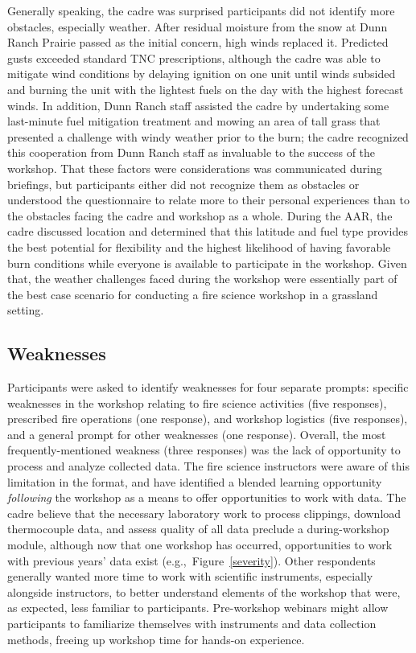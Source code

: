 \documentclass[fire,casereport,accept,moreauthors,pdftex]{Definitions/mdpi}  %
\begin{document}
Generally speaking, the cadre was surprised participants did not identify more obstacles, especially weather.
After residual moisture from the snow at Dunn Ranch Prairie passed as the initial concern, high winds replaced it.
Predicted gusts exceeded standard TNC prescriptions, although the cadre was able to mitigate wind conditions by delaying ignition on one unit until winds subsided and burning the unit with the lightest fuels on the day with the highest forecast winds.
In addition, Dunn Ranch staff assisted the cadre by undertaking some last-minute fuel mitigation treatment and mowing an area of tall grass that presented a challenge with windy weather prior to the burn; the cadre recognized this cooperation from Dunn Ranch staff as invaluable to the success of the workshop.
That these factors were considerations was communicated during briefings, but participants either did not recognize them as obstacles or understood the questionnaire to relate more to their personal experiences than to the obstacles facing the cadre and workshop as a whole.
During the AAR, the cadre discussed location and determined that this latitude and fuel type provides the best potential for flexibility and the highest likelihood of having favorable burn conditions while everyone is available to participate in the workshop. 
Given that, the weather challenges faced during the workshop were essentially part of the best case scenario for conducting a fire science workshop in a grassland setting.

\subsection{Weaknesses}

Participants were asked to identify weaknesses for four separate prompts: specific weaknesses in the workshop relating to fire science activities (five responses), prescribed fire operations (one response), and workshop logistics (five responses), and a general prompt for other weaknesses (one response).
Overall, the most frequently-mentioned weakness (three responses) was the lack of opportunity to process and analyze collected data.
The fire science instructors were aware of this limitation in the format, and have identified a blended learning opportunity \emph{following} the workshop as a means to offer opportunities to work with data.
The cadre believe that the necessary laboratory work to process clippings, download thermocouple data, and assess quality of all data preclude a during-workshop module, although now that one workshop has occurred, opportunities to work with previous years' data exist (e.g.,~Figure~\ref{severity}).
Other respondents generally wanted more time to work with scientific instruments, especially alongside instructors, to better understand elements of the workshop that were, as expected, less familiar to participants.
Pre-workshop webinars might allow participants to familiarize themselves with instruments and data collection methods, freeing up workshop time for hands-on experience. 
\end{document}
